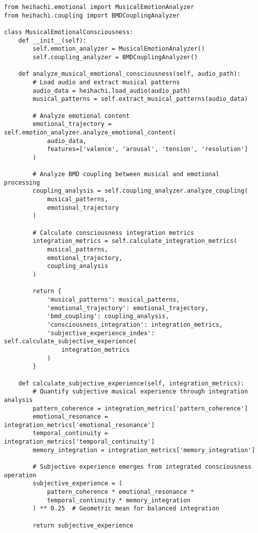 \documentclass[12pt,a4paper]{article}
\begin{document}
\begin{lstlisting}[style=pythonstyle, caption=Musical-Emotional Consciousness Analysis]
from heihachi.emotional import MusicalEmotionAnalyzer
from heihachi.coupling import BMDCouplingAnalyzer

class MusicalEmotionalConsciousness:
    def __init__(self):
        self.emotion_analyzer = MusicalEmotionAnalyzer()
        self.coupling_analyzer = BMDCouplingAnalyzer()
        
    def analyze_musical_emotional_consciousness(self, audio_path):
        # Load audio and extract musical patterns
        audio_data = heihachi.load_audio(audio_path)
        musical_patterns = self.extract_musical_patterns(audio_data)
        
        # Analyze emotional content
        emotional_trajectory = self.emotion_analyzer.analyze_emotional_content(
            audio_data,
            features=['valence', 'arousal', 'tension', 'resolution']
        )
        
        # Analyze BMD coupling between musical and emotional processing
        coupling_analysis = self.coupling_analyzer.analyze_coupling(
            musical_patterns,
            emotional_trajectory
        )
        
        # Calculate consciousness integration metrics
        integration_metrics = self.calculate_integration_metrics(
            musical_patterns,
            emotional_trajectory,
            coupling_analysis
        )
        
        return {
            'musical_patterns': musical_patterns,
            'emotional_trajectory': emotional_trajectory,
            'bmd_coupling': coupling_analysis,
            'consciousness_integration': integration_metrics,
            'subjective_experience_index': self.calculate_subjective_experience(
                integration_metrics
            )
        }
    
    def calculate_subjective_experience(self, integration_metrics):
        # Quantify subjective musical experience through integration analysis
        pattern_coherence = integration_metrics['pattern_coherence']
        emotional_resonance = integration_metrics['emotional_resonance']
        temporal_continuity = integration_metrics['temporal_continuity']
        memory_integration = integration_metrics['memory_integration']
        
        # Subjective experience emerges from integrated consciousness operation
        subjective_experience = (
            pattern_coherence * emotional_resonance * 
            temporal_continuity * memory_integration
        ) ** 0.25  # Geometric mean for balanced integration
        
        return subjective_experience
\end{lstlisting}
\end{document}
